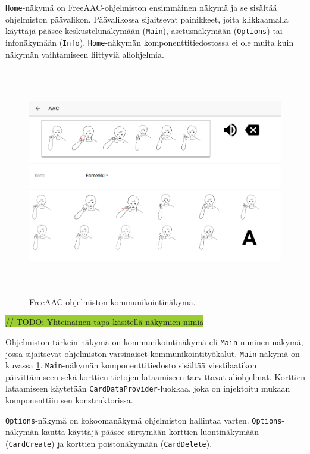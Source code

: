 \documentclass[utf8]{gradu3}
\begin{document}
\texttt{Home}-näkymä on FreeAAC-ohjelmiston ensimmäinen näkymä ja se sisältää ohjelmiston päävalikon. Päävalikossa sijaitsevat painikkeet, joita klikkaamalla käyttäjä pääsee keskustelunäkymään (\texttt{Main}), asetusnäkymään (\texttt{Options}) tai infonäkymään (\texttt{Info}). \texttt{Home}-näkymän komponenttitiedostossa ei ole muita kuin näkymän vaihtamiseen liittyviä aliohjelmia.

\begin{figure}[h]\centering
  \includegraphics[height=10cm,keepaspectratio]{main-view-layout}
  \caption[FreeAAC-ohjelmiston kommunikointinäkymä.]
  {FreeAAC-ohjelmiston kommunikointinäkymä.}
  \label{fig:main-view-layout}
\end{figure}

\colorbox{YellowGreen}{// TODO: Yhteinäinen tapa käsitellä näkymien nimiä}

Ohjelmiston tärkein näkymä on kommunikointinäkymä eli \texttt{Main}-niminen näkymä, jossa sijaitsevat ohjelmiston varsinaiset kommunikointityökalut. \texttt{Main}-näkymä on kuvassa \ref{fig:main-view-layout}. \texttt{Main}-näkymän komponenttitiedosto sisältää viestilaatikon päivittämiseen sekä korttien tietojen lataamiseen tarvittavat aliohjelmat. Korttien lataamiseen käytetään \texttt{CardDataProvider}-luokkaa, joka on injektoitu mukaan komponenttiin sen konstruktorissa.

\texttt{Options}-näkymä on kokoomanäkymä ohjelmiston hallintaa varten. \texttt{Options}-näkymän kautta käyttäjä pääsee siirtymään korttien luontinäkymään (\texttt{CardCreate}) ja korttien poistonäkymään (\texttt{CardDelete}).
\end{document}
